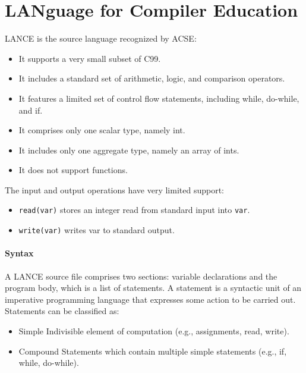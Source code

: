\section{LANguage for Compiler Education}
LANCE is the source language recognized by ACSE:
\begin{itemize}
    \item It supports a very small subset of C99.
    \item It includes a standard set of arithmetic, logic, and comparison operators.
    \item It features a limited set of control flow statements, including while, do-while, and if.
    \item It comprises only one scalar type, namely int.
    \item It includes only one aggregate type, namely an array of ints.
    \item It does not support functions.
\end{itemize}
The input and output operations have very limited support: 
\begin{itemize}
    \item \texttt{read(var)} stores an integer read from standard input into \texttt{var}.
    \item \texttt{write(var)} writes var to standard output.
\end{itemize}

\paragraph*{Syntax}
A LANCE source file comprises two sections: variable declarations and the program body, which is a list of statements.
A statement is a syntactic unit of an imperative programming language that expresses some action to be carried out.
Statements can be classified as:
\begin{itemize}
    \item Simple Indivisible element of computation (e.g., assignments, read, write). 
    \item Compound Statements which contain multiple simple statements (e.g., if, while, do-while). 
\end{itemize}

